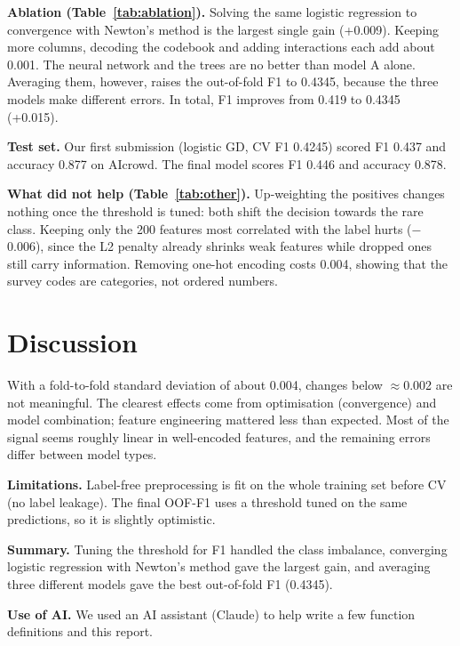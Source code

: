 \documentclass[10pt,conference,compsocconf]{IEEEtran}
\begin{document}
\textbf{Ablation (Table~\ref{tab:ablation}).}
Solving the same logistic regression to convergence with Newton's method is the largest single gain (+0.009).
Keeping more columns, decoding the codebook and adding interactions each add about 0.001.
The neural network and the trees are no better than model A alone.
Averaging them, however, raises the out-of-fold F1 to 0.4345, because the three models make different errors.
In total, F1 improves from 0.419 to 0.4345 (+0.015).

\textbf{Test set.} Our first submission (logistic GD, CV F1 0.4245) scored F1 0.437 and accuracy 0.877 on AIcrowd.
The final model scores F1 0.446 and accuracy 0.878.

\textbf{What did not help (Table~\ref{tab:other}).}
Up-weighting the positives changes nothing once the threshold is tuned: both shift the decision towards the rare class.
Keeping only the 200 features most correlated with the label hurts ($-$0.006), since the L2 penalty already shrinks weak features while dropped ones still carry information.
Removing one-hot encoding costs 0.004, showing that the survey codes are categories, not ordered numbers.

\section{Discussion}
With a fold-to-fold standard deviation of about 0.004, changes below $\approx$0.002 are not meaningful.
The clearest effects come from optimisation (convergence) and model combination; feature engineering mattered less than expected.
Most of the signal seems roughly linear in well-encoded features, and the remaining errors differ between model types.

\textbf{Limitations.}
Label-free preprocessing is fit on the whole training set before CV (no label leakage).
The final OOF-F1 uses a threshold tuned on the same predictions, so it is slightly optimistic.

\textbf{Summary.}
Tuning the threshold for F1 handled the class imbalance, converging logistic regression with Newton's method gave the largest gain, and averaging three different models gave the best out-of-fold F1 (0.4345).

\textbf{Use of AI.} We used an AI assistant (Claude) to help write a few function definitions and this report.
\end{document}
